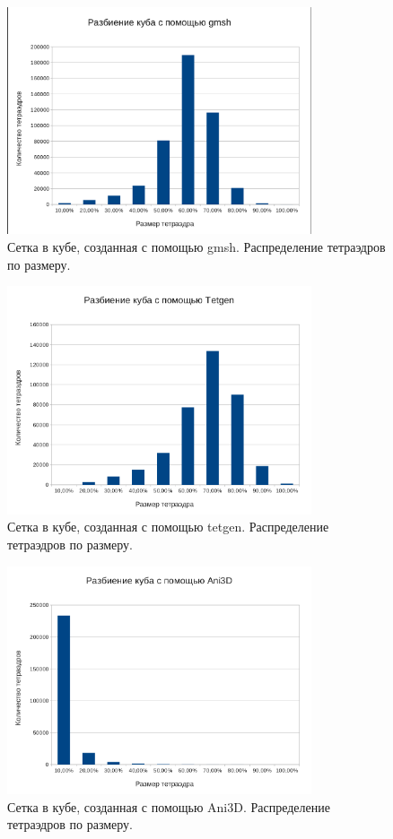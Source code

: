 \begin{figure}[htp]
\centering
\includegraphics[width=0.8\textwidth]{png/gmsh-stats.png}
\caption{Сетка в кубе, созданная с помощью gmsh. Распределение тетраэдров по размеру.}
\end{figure}

\begin{figure}[htp]
\centering
\includegraphics[width=0.8\textwidth]{png/tetgen-stats.png}
\caption{Сетка в кубе, созданная с помощью tetgen. Распределение тетраэдров по размеру.}
\end{figure}

\begin{figure}[htp]
\centering
\includegraphics[width=0.8\textwidth]{png/ani3d-stats.png}
\caption{Сетка в кубе, созданная с помощью Ani3D. Распределение тетраэдров по размеру.}
\end{figure}

